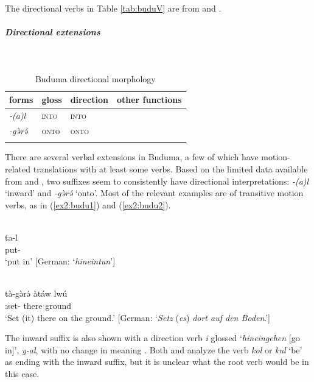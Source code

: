 The directional verbs in Table \ref{tab:buduV} are from \citet{gaudicheLangueBoudouma1938} and \citet{lukasSpracheBudumaIm1939}.

\subparagraph{Directional extensions}~

\begin{table}[H]
	\caption{Buduma directional morphology}
	\label{tab:budu}
	\begin{tabular}{llll} %
		\lsptoprule
		forms & gloss & direction  & other functions  \\ %
		\midrule
		\textit{-(a)l}  &  \textsc{into}  &  \textsc{into} &    \\
		\textit{-gə̀rə́}  &  \textsc{onto}  & \textsc{onto}   &    \\
		\lspbottomrule
	\end{tabular}
\end{table} 

There are several verbal extensions in Buduma, a few of which have motion-related translations with at least some verbs. Based on the limited data available from \citet{lukasSpracheBudumaIm1939} and \citet{awaganaGrammatikBudumaPhonologie2001}, two suffixes seem to consistently have directional interpretations: \textit{-(a)l} `inward' and \textit{-gə̀rə́} `onto'. Most of the relevant examples are of transitive motion verbs, as in (\ref{ex2:budu1}) and (\ref{ex2:budu2}).

\ea\label{ex2:budu1}
 \\
\gll ta-l \\
put- \\
\glt `put in' [German: `\textit{hineintun}']

\ex\label{ex2:budu2}
 \\
\gll tà-gə̀rə́ àtáw lwú	\\
:set- there ground	\\
\glt `Set (it) there on the ground.' [German: `\textit{Setz} (\textit{es}) \textit{dort auf den Boden}.']
\z

The inward suffix is also shown with a direction verb \textit{i} glossed `\textit{hineingehen} [go in]', \textit{y-al}, with no change in meaning \citep[60]{lukasSpracheBudumaIm1939}. Both \citet[60]{lukasSpracheBudumaIm1939} and \citet{awaganaGrammatikBudumaPhonologie2001} analyze the verb \textit{kol} or \textit{kul} `be' as ending with the inward suffix, but it is unclear what the root verb would be in this case.

